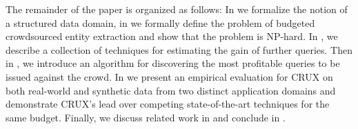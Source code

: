 The remainder of the paper is organized as follows: In  we formalize the notion of a structured data domain, in  we formally define the problem of budgeted crowdsourced entity extraction and show that the problem is NP-hard. In , we describe a collection of techniques for estimating the gain of further queries. Then in , we introduce an algorithm for discovering the most profitable queries to be issued against the crowd. In  we present an empirical evaluation for CRUX on both real-world and synthetic data from two distinct application domains and demonstrate CRUX's lead over competing state-of-the-art techniques for the same budget. Finally, we discuss related work in  and conclude in .
%
%
